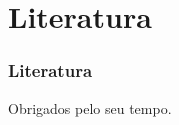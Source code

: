 \documentclass{beamer}
\begin{document}
\section{Literatura}

\begin{frame}[allowframebreaks]
	\frametitle{Literatura}
	 
	
  \nocite{*}
\end{frame}



\begin{frame}
  \begin{center}
    \Huge {\color{red} Obrigados pelo seu tempo.} 
  \end{center}
\end{frame}
\end{document}
